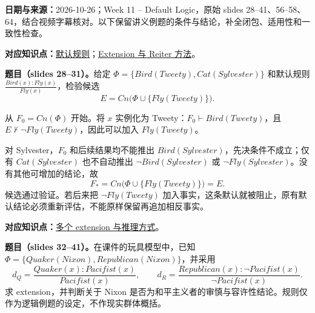 \begingroup
\renewcommand{\recordid}[1]{}
\renewcommand{\relatedtopic}[2]{\hyperref[topic:#1]{#2}}


\textbf{日期与来源：}2026-10-26；Week 11 -- Default Logic，原始 slides 28--41、56--58、64，结合视频字幕核对。以下保留讲义例题的条件与结论，补全闭包、适用性和一致性检查。


\textbf{对应知识点：}\relatedtopic{SC3000-L10-T01}{默认规则}；\relatedtopic{SC3000-L10-T02}{Extension 与 Reiter 方法}。

\textbf{题目（slides 28--31）。}给定 $\Phi=\{Bird(Tweety),Cat(Sylvester)\}$ 和默认规则 $\frac{Bird(x):Fly(x)}{Fly(x)}$，检验候选
\[
 E=Cn\bigl(\Phi\cup\{Fly(Tweety)\}\bigr).
\]

\begin{workedsolution}
从 $F_0=Cn(\Phi)$ 开始。将 $x$ 实例化为 Tweety：$F_0\vdash Bird(Tweety)$，且 $E\nvdash\neg Fly(Tweety)$，因此可以加入 $Fly(Tweety)$。

对 Sylvester，$F_0$ 和后续结果均不能推出 $Bird(Sylvester)$，先决条件不成立；仅有 $Cat(Sylvester)$ 也不自动推出 $\neg Bird(Sylvester)$ 或 $\neg Fly(Sylvester)$。没有其他可增加的结论，故
\[
 F_*=Cn\bigl(\Phi\cup\{Fly(Tweety)\}\bigr)=E.
\]
候选通过验证。若后来把 $\neg Fly(Tweety)$ 加入事实，这条默认就被阻止，原有默认结论必须重新评估，不能原样保留再追加相反事实。
\end{workedsolution}


\textbf{对应知识点：}\relatedtopic{SC3000-L10-T02}{多个 extension 与推理方式}。
\par\nopagebreak[4]
\textbf{题目（slides 32--41）。}在课件的玩具模型中，已知 $\Phi=\{Quaker(Nixon),Republican(Nixon)\}$，并采用
\[
 d_Q=\frac{Quaker(x):Pacifist(x)}{Pacifist(x)},\qquad
 d_R=\frac{Republican(x):\neg Pacifist(x)}{\neg Pacifist(x)}.
\]
求 extension，并判断关于 Nixon 是否为和平主义者的审慎与容许性结论。规则仅作为逻辑例题的设定，不作现实群体概括。

